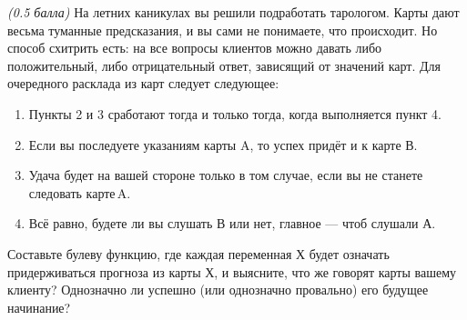 \question
\textit{(0.5 балла)} На летних каникулах вы решили подработать тарологом. Карты дают весьма туманные предсказания, и вы сами не понимаете, что происходит. Но способ схитрить есть: на все вопросы клиентов можно давать либо положительный, либо отрицательный ответ, зависящий от значений карт. Для очередного расклада из карт следует следующее:

\begin{enumerate}
    \item Пункты 2 и 3 сработают тогда и только тогда, когда выполняется пункт 4.
    \item Если вы последуете указаниям карты A, то успех придёт и к карте В.
    \item Удача будет на вашей стороне только в том случае, если вы не станете следовать карте A.
    \item Всё равно, будете ли вы слушать В или нет, главное — чтоб слушали А.
\end{enumerate}

Составьте булеву функцию, где каждая переменная Х будет означать \flqq придерживаться прогноза из карты Х\frqq, и выясните, что же говорят карты вашему клиенту? Однозначно ли успешно (или однозначно провально) его будущее начинание?